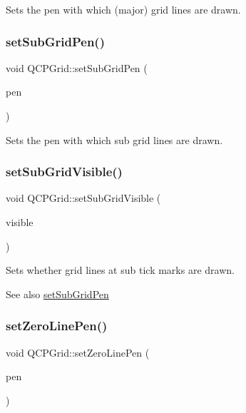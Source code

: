 Sets the pen with which (major) grid lines are drawn. \mbox{\label{class_q_c_p_grid_a9edd3593f384d1f0b0202a39cef4453d}} 
\subsubsection{\texorpdfstring{set\+Sub\+Grid\+Pen()}{setSubGridPen()}}
{\footnotesize\ttfamily void Q\+C\+P\+Grid\+::set\+Sub\+Grid\+Pen (\begin{DoxyParamCaption}\item[{const Q\+Pen \&}]{pen }\end{DoxyParamCaption})}

Sets the pen with which sub grid lines are drawn. \mbox{\label{class_q_c_p_grid_ad4ad6bf714ec45e08845456355a1b700}} 
\subsubsection{\texorpdfstring{set\+Sub\+Grid\+Visible()}{setSubGridVisible()}}
{\footnotesize\ttfamily void Q\+C\+P\+Grid\+::set\+Sub\+Grid\+Visible (\begin{DoxyParamCaption}\item[{bool}]{visible }\end{DoxyParamCaption})}

Sets whether grid lines at sub tick marks are drawn.

\begin{DoxySeeAlso}{See also}
\hyperlink{class_q_c_p_grid_a9edd3593f384d1f0b0202a39cef4453d}{set\+Sub\+Grid\+Pen} 
\end{DoxySeeAlso}
\mbox{\label{class_q_c_p_grid_a209f40fdb252397b418b82d3494d8ea0}} 
\subsubsection{\texorpdfstring{set\+Zero\+Line\+Pen()}{setZeroLinePen()}}
{\footnotesize\ttfamily void Q\+C\+P\+Grid\+::set\+Zero\+Line\+Pen (\begin{DoxyParamCaption}\item[{const Q\+Pen \&}]{pen }\end{DoxyParamCaption})}

